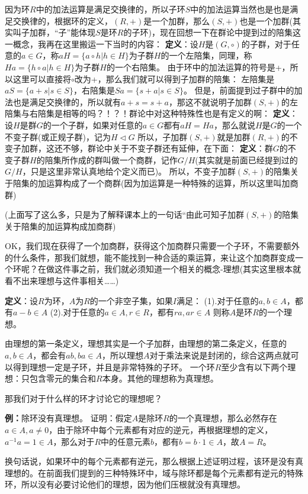 \documentclass[12pt, a4paper, oneside]{ctexart}
\begin{document}
因为环$R$中的加法运算是满足交换律的，所以子环$S$中的加法运算当然也是也是满足交换律的，根据环的定义，$(R,+)$是一个加群，那么$(S,+)$也是一个加群(其实叫子加群，“子”能体现$S$是环$R$的子环)，现在回想一下在群论中提到过的陪集这一概念，我再在这里搬运一下当时的内容：
\textbf{定义}：设$H$是$(G,\circ)$的子群，对于任意的$a\in G$，称$aH=\{a\circ h|h\in H\}$为子群$H$的一个左陪集，同理，称$Ha=\{h\circ a|h\in H\}$为子群$H$的一个右陪集。
由于环中的加法运算的符号是+，所以这里可以直接将$\circ$改为+，那么我们就可以得到子加群的陪集：
左陪集是$aS=\{a+s|s\in S\}$，右陪集是$Sa=\{s+a|s\in S\}$。
但是，前面提到过子群中的加法也是满足交换律的，所以就有$a+s=s+a$，那这不就说明子加群$(S,+)$的左陪集与右陪集是相等的吗？！？！群论中对这种特殊性也是有定义的啊：
\textbf{定义}：设$H$是群$G$的一个子群，如果对任意的$a\in G$都有$aH=Ha$，那么就说$H$是$G$的一个不变子群(或正规子群)，记为$H\vartriangleleft G$
所以，子加群$(S,+)$就是加群$(R,+)$的不变子加群，这还不够，群论中关于不变子群还有延伸，在下面：
\textbf{定义}：群$G$的不变子群$H$的陪集所作成的群叫做一个商群，记作$G/H$(其实就是前面已经提到过的$G/H$，只是这里非常认真地给个定义而已)。
所以，不变子加群$(S,+)$的陪集关于陪集的加运算构成了一个商群(因为加运算是一种特殊的运算，所以这里叫加商群)

(上面写了这么多，只是为了解释课本上的一句话“由此可知子加群$(S,+)$的陪集关于陪集的加运算构成加商群)

OK，我们现在获得了一个加商群，获得这个加商群只需要一个子环，不需要额外的什么条件，那我们就想，能不能找到一种合适的乘运算，来让这个加商群变成一个环呢？在做这件事之前，我们就必须知道一个相关的概念-理想(其实这里根本就看不出来理想与这件事相关……)

\textbf{定义}：设$R$为环，$A$为$R$的一个非空子集，如果$I$满足：
(1).对于任意的$a,b\in A$，都有$a-b\in A$
(2).对于任意的$a\in A,r\in R$，都有$ra,ar\in A$
则称$A$是环$R$的一个理想。

由理想的第一条定义，理想其实是一个子加群，由理想的第二条定义，任意的$a,b\in A$，都会有$ab,ba\in A$，所以理想$A$对于乘法来说是封闭的，综合这两点就可以得到理想一定是子环，并且是非常特殊的子环。
一个环$R$至少含有以下两个理想：只包含零元的集合和$R$本身。其他的理想称为真理想。

那我们对于什么样的环才讨论它的理想呢？

\textbf{例：}除环没有真理想。
证明：假定$A$是除环$R$的一个真理想，那么必然存在$a\in A,a\neq 0$，由于除环中每个元素都有对应的逆元，再根据理想的定义，$a^{-1}a=1\in A$，那么对于$R$中的任意元素$b$，都有$b=b\cdot 1\in A$，故$A=R$。

换句话说，如果环中的每个元素都有逆元，那么根据上述证明过程，该环是没有真理想的。在前面我们提到的三种特殊环中，域与除环都是每个元素都有逆元的特殊环，所以没有必要讨论他们的理想，因为他们压根就没有真理想。
\end{document}
